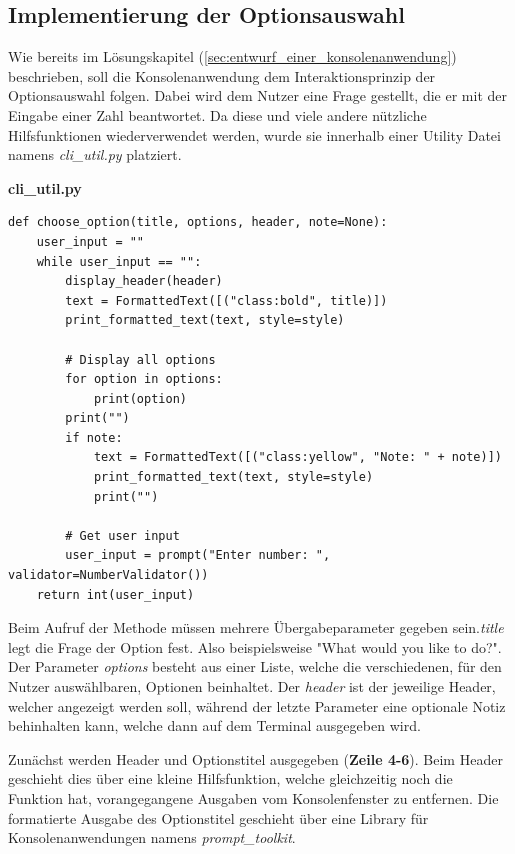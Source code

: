 \documentclass[oneside]{ausarbeitung}
\begin{document}
\subsection{Implementierung der Optionsauswahl}
\label{sub:implementierung_der_optionsauswahl}

Wie bereits im Lösungskapitel (\ref{sec:entwurf_einer_konsolenanwendung}) beschrieben, soll die Konsolenanwendung dem Interaktionsprinzip der Optionsauswahl folgen. Dabei wird dem Nutzer eine Frage gestellt, die er mit der Eingabe einer Zahl beantwortet. Da diese und viele andere nützliche Hilfsfunktionen wiederverwendet werden, wurde sie innerhalb einer Utility Datei namens \textit{cli\_util.py} platziert.

\lstset{language=Python}
\lstset{frame=lines}
\lstset{basicstyle=\footnotesize}
\textbf{cli\_util.py}
\begin{lstlisting}
def choose_option(title, options, header, note=None):
	user_input = ""
	while user_input == "":
		display_header(header)
		text = FormattedText([("class:bold", title)])
		print_formatted_text(text, style=style)

		# Display all options
		for option in options:
			print(option)
		print("")
		if note:
			text = FormattedText([("class:yellow", "Note: " + note)])
			print_formatted_text(text, style=style)
			print("")

		# Get user input
		user_input = prompt("Enter number: ", validator=NumberValidator())
	return int(user_input)
\end{lstlisting}

Beim Aufruf der Methode müssen mehrere Übergabeparameter gegeben sein.\textit{title} legt die Frage der Option fest. Also beispielsweise "What would you like to do?". Der Parameter \textit{options} besteht aus einer Liste, welche die verschiedenen, für den Nutzer auswählbaren, Optionen beinhaltet. Der \textit{header} ist der jeweilige Header, welcher angezeigt werden soll, während der letzte Parameter eine optionale Notiz behinhalten kann, welche dann auf dem Terminal ausgegeben wird.

Zunächst werden Header und Optionstitel ausgegeben (\textbf{Zeile 4-6}). Beim Header geschieht dies über eine kleine Hilfsfunktion, welche gleichzeitig noch die Funktion hat, vorangegangene Ausgaben vom Konsolenfenster zu entfernen. Die formatierte Ausgabe des Optionstitel geschieht über eine Library für Konsolenanwendungen namens \textit{prompt\_toolkit}.
\end{document}
